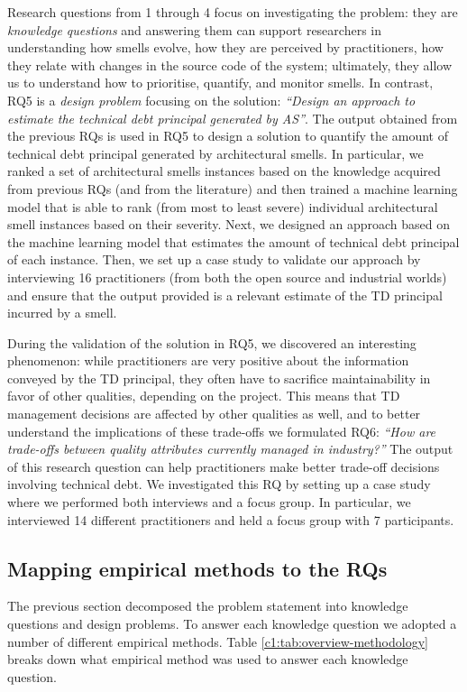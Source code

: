 Research questions from 1 through 4 focus on investigating the problem: they are \emph{knowledge questions} and answering them can support researchers in understanding how smells evolve, how they are perceived by practitioners, how they relate with changes in the source code of the system; ultimately, they allow us to understand how to prioritise, quantify, and monitor smells.
In contrast, RQ5 is a \emph{design problem} focusing on the solution: \textit{``Design an approach to estimate the technical debt principal generated by AS''}.
The output obtained from the previous RQs is used in RQ5 to design a solution to quantify the amount of technical debt principal generated by architectural smells.
In particular, we ranked a set of architectural smells instances based on the knowledge acquired from previous RQs (and from the literature) and then trained a machine learning model that is able to rank (from most to least severe) individual architectural smell instances based on their severity.
Next, we designed an approach based on the machine learning model that estimates the amount of technical debt principal of each instance.
Then, we set up a case study to validate our approach by interviewing 16 practitioners (from both the open source and industrial worlds) and ensure that the output provided is a relevant estimate of the TD principal incurred by a smell.

During the validation of the solution in RQ5, we discovered an interesting phenomenon: while practitioners are very positive about the information conveyed by the TD principal, they often have to sacrifice maintainability in favor of other qualities, depending on the project.
This means that TD management decisions are affected by other qualities as well, and to better understand the implications of these trade-offs we formulated RQ6: \textit{``How are trade-offs between quality attributes currently managed in industry?''}
The output of this research question can help practitioners make better trade-off decisions involving technical debt.
We investigated this RQ by setting up a case study where we performed both interviews and a focus group.
In particular, we interviewed 14 different practitioners and held a focus group with 7 participants.


\subsection{Mapping empirical methods to the RQs}
The previous section decomposed the problem statement into knowledge questions and design problems.
To answer each knowledge question we adopted a number of different empirical methods.
Table \ref{c1:tab:overview-methodology} breaks down what empirical method was used to answer each knowledge question.

